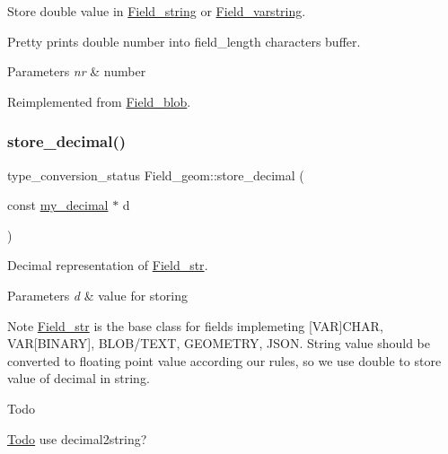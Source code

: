 Store double value in \mbox{\hyperlink{classField__string}{Field\+\_\+string}} or \mbox{\hyperlink{classField__varstring}{Field\+\_\+varstring}}.

Pretty prints double number into field\+\_\+length characters buffer.


\begin{DoxyParams}{Parameters}
{\em nr} & number \\
\hline
\end{DoxyParams}


Reimplemented from \mbox{\hyperlink{classField__blob_a2bc7bea5075f5ebbee1a11c13e37b5b2}{Field\+\_\+blob}}.

\mbox{\label{classField__geom_a898e7030c139559c40683399075788a5}} 
\subsubsection{\texorpdfstring{store\+\_\+decimal()}{store\_decimal()}}
{\footnotesize\ttfamily type\+\_\+conversion\+\_\+status Field\+\_\+geom\+::store\+\_\+decimal (\begin{DoxyParamCaption}\item[{const \mbox{\hyperlink{classmy__decimal}{my\+\_\+decimal}} $\ast$}]{d }\end{DoxyParamCaption})\hspace{0.3cm}{\ttfamily [virtual]}}

Decimal representation of \mbox{\hyperlink{classField__str}{Field\+\_\+str}}.


\begin{DoxyParams}{Parameters}
{\em d} & value for storing\\
\hline
\end{DoxyParams}
\begin{DoxyNote}{Note}
\mbox{\hyperlink{classField__str}{Field\+\_\+str}} is the base class for fields implemeting \mbox{[}V\+AR\mbox{]}C\+H\+AR, V\+AR\mbox{[}B\+I\+N\+A\+RY\mbox{]}, B\+L\+O\+B/\+T\+E\+XT, G\+E\+O\+M\+E\+T\+RY, J\+S\+ON. String value should be converted to floating point value according our rules, so we use double to store value of decimal in string.
\end{DoxyNote}
\begin{DoxyRefDesc}{Todo}
\item[\mbox{\hyperlink{todo__todo000011}{Todo}}]use decimal2string?\end{DoxyRefDesc}



